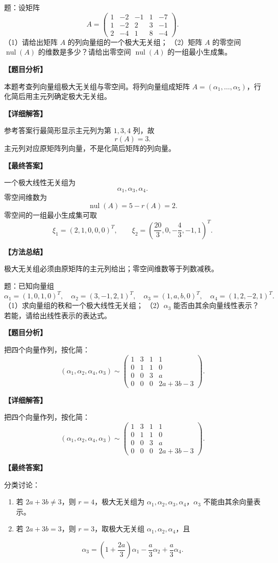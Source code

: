 ﻿\documentclass[11pt,a4paper,UTF8]{ctexart}
\newcommand{\nul}{\operatorname{nul}}
\begin{document}
\begin{answerbox}
题：设矩阵
\[
A=\begin{pmatrix}
1&-2&-1&1&-7\\
1&-2&2&3&-1\\
2&-4&1&8&-4
\end{pmatrix}.
\]
（1）请给出矩阵 $A$ 的列向量组的一个极大无关组；
（2）矩阵 $A$ 的零空间 $\operatorname{nul}(A)$ 的维数是多少？请给出零空间 $\operatorname{nul}(A)$ 的一组最小生成集。

\textbf{【题目分析】}

本题考查列向量组极大无关组与零空间。将列向量组成矩阵 \(A=(\alpha_1,\ldots,\alpha_5)\)，行化简后用主元列确定极大无关组。

\textbf{【详细解答】}

参考答案行最简形显示主元列为第 \(1,3,4\) 列，故
\[
r(A)=3.
\]
主元列对应原矩阵列向量，不是化简后矩阵的列向量。

\textbf{【最终答案】}

一个极大线性无关组为
\[
\alpha_1,\alpha_3,\alpha_4.
\]
零空间维数为
\[
\nul(A)=5-r(A)=2.
\]
零空间的一组最小生成集可取
\[
\xi_1=(2,1,0,0,0)^T,\qquad
\xi_2=\left(\frac{20}{3},0,-\frac43,-1,1\right)^T.
\]

\textbf{【方法总结】}

极大无关组必须由原矩阵的主元列给出；零空间维数等于列数减秩。
\end{answerbox}
\begin{answerbox}
题：已知向量组
\[
\alpha_1=(1,0,1,0)^T,\quad
\alpha_2=(3,-1,2,1)^T,\quad
\alpha_3=(1,a,b,0)^T,\quad
\alpha_4=(1,2,-2,1)^T.
\]
（1）求向量组的秩和一个极大线性无关组；
（2）$\alpha_3$ 能否由其余向量线性表示？若能，请给出线性表示的表达式。

\textbf{【题目分析】}

把四个向量作列，按化简：
\[
(\alpha_1,\alpha_2,\alpha_4,\alpha_3)
\sim
\begin{pmatrix}
1&3&1&1\\
0&1&1&0\\
0&0&3&a\\
0&0&0&2a+3b-3
\end{pmatrix}.
\]

\textbf{【详细解答】}

把四个向量作列，按化简：
\[
(\alpha_1,\alpha_2,\alpha_4,\alpha_3)
\sim
\begin{pmatrix}
1&3&1&1\\
0&1&1&0\\
0&0&3&a\\
0&0&0&2a+3b-3
\end{pmatrix}.
\]

\textbf{【最终答案】}

分类讨论：
\begin{enumerate}
\item 若 $2a+3b\ne3$，则 $r=4$，极大无关组为 $\alpha_1,\alpha_2,\alpha_3,\alpha_4$，$\alpha_3$ 不能由其余向量表示。
\item 若 $2a+3b=3$，则 $r=3$，取极大无关组 $\alpha_1,\alpha_2,\alpha_4$，且
\end{enumerate}
\[
\alpha_3=\left(1+\frac{2a}{3}\right)\alpha_1-\frac a3\alpha_2+\frac a3\alpha_4.
\]
\end{answerbox}
\end{document}
